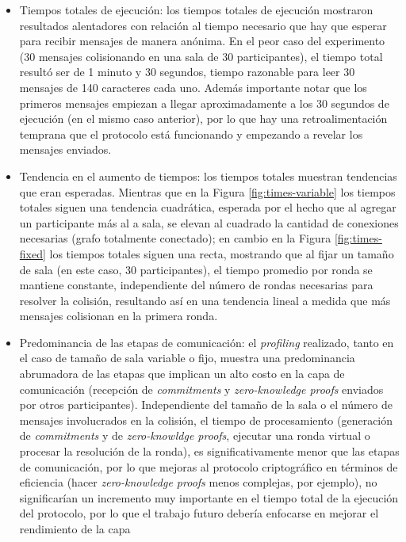 \begin{itemize}
	\item Tiempos totales de ejecución: los tiempos totales de ejecución mostraron 
	resultados alentadores con relación al tiempo necesario que hay que esperar para 
	recibir mensajes de manera anónima. En el peor caso del experimento (30 mensajes 
	colisionando en una sala de 30 participantes), el tiempo total resultó ser de 
	1 minuto y 30 segundos, tiempo razonable para leer 30 mensajes de 140 caracteres 
	cada uno. Además importante notar que los primeros mensajes empiezan a llegar 
	aproximadamente a los 30 segundos de ejecución (en el mismo caso anterior), por lo que 
	hay una retroalimentación temprana que el protocolo está funcionando y empezando a 
	revelar los mensajes enviados.
	\item Tendencia en el aumento de tiempos: los tiempos totales muestran tendencias 
	que eran esperadas. Mientras que en la Figura \ref{fig:times-variable} los tiempos 
	totales siguen una tendencia cuadrática, esperada por el hecho que al agregar 
	un participante más al a sala, se elevan al cuadrado la cantidad de conexiones 
	necesarias (grafo totalmente conectado); en cambio en la Figura \ref{fig:times-fixed} los
	tiempos totales siguen una recta, mostrando que al fijar un tamaño de sala (en este caso, 
	30 participantes), el tiempo promedio por ronda se mantiene constante, independiente 
	del número de rondas necesarias para resolver la colisión, resultando así en una 
	tendencia lineal a medida que más mensajes colisionan en la primera ronda.
	\item Predominancia de las etapas de comunicación: el \emph{profiling} realizado, tanto 
	en el caso de tamaño de sala variable o fijo, muestra una predominancia abrumadora 
	de las etapas que implican un alto costo en la capa de comunicación (recepción de 
	\emph{commitments} y \emph{zero-knowledge proofs} enviados por otros participantes). 
	Independiente del tamaño de la sala o el número de mensajes involucrados en la colisión, 
	el tiempo de procesamiento (generación de \emph{commitments} y de \emph{zero-knowldge proofs}, 
	ejecutar una ronda virtual o procesar la resolución de la ronda), es significativamente 
	menor que las etapas de comunicación, por lo que mejoras al protocolo criptográfico en 
	términos de eficiencia (hacer \emph{zero-knowledge proofs} menos complejas, por ejemplo), no 
	significarían un incremento muy importante en el tiempo total de la ejecución del protocolo, 
	por lo que el trabajo futuro debería enfocarse en mejorar el rendimiento de la capa 

\end{itemize}
